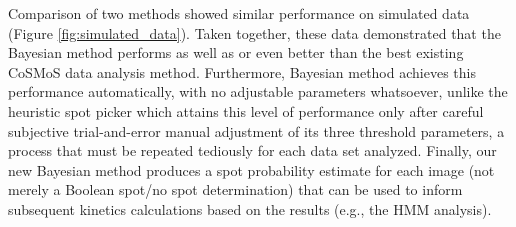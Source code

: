 Comparison of two methods showed similar performance on simulated data (Figure \ref{fig:simulated_data}). Taken together, these data demonstrated that the Bayesian method performs as well as or even better than the best existing CoSMoS data analysis method. Furthermore, Bayesian method achieves this performance automatically, with no adjustable parameters whatsoever, unlike the heuristic spot picker which attains this level of performance only after careful subjective trial-and-error manual adjustment of its three threshold parameters, a process that must be repeated tediously for each data set analyzed. Finally, our new Bayesian method produces a spot probability estimate for each image (not merely a Boolean spot/no spot determination) that can be used to inform subsequent kinetics calculations based on the results (e.g., the HMM analysis).

